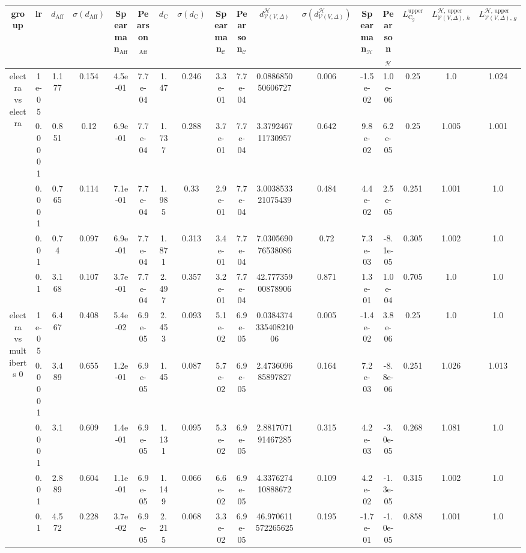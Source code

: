 \begin{tabular}{|c|c|c|c|c|c|c|c|c|c|c|c|c|c|c|c|c|}
\hline
group & lr & $d_{\mathrm{Aff}}$ & $\sigma(d_{\mathrm{Aff}})$ & Spearman$_{\mathrm{Aff}}$ & Pearson$_{\mathrm{Aff}}$ & $d_{\mathrm{C}}$ & $\sigma(d_{\mathrm{C}})$ & Spearman$_{\mathcal{C}}$ & Pearson$_{\mathcal{C}}$ & $d^\mathcal{H}_{\mathcal{V}(V,\Delta)}$ & $\sigma(d^\mathcal{H}_{\mathcal{V}(V,\Delta)})$ & Spearman$_{\mathcal{H}}$ & Pearson$_{\mathcal{H}}$ & $L_{\mathrm{C}_g}^{\mathrm{upper}}$ & $L^{\mathcal{H},\,\mathrm{upper}}_{\mathcal{V}(V,\Delta),\,h}$ & $L^{\mathcal{H},\,\mathrm{upper}}_{\mathcal{V}(V,\Delta),\,g}$ \\
\hline
\multirow{5}{*}{electra  vs electra } & 1e-05 & 1.177 & 0.154 & 4.5e-01 & 7.7e-04 & 1.47 & 0.246 & 3.3e-01 & 7.7e-04 & 0.088685050606727 & 0.006 & -1.5e-02 & 1.0e-06 & 0.25 & 1.0 & 1.024 \\
 & 0.0001 & 0.851 & 0.12 & 6.9e-01 & 7.7e-04 & 1.737 & 0.288 & 3.7e-01 & 7.7e-04 & 3.379246711730957 & 0.642 & 9.8e-02 & 6.2e-05 & 0.25 & 1.005 & 1.001 \\
 & 0.001 & 0.765 & 0.114 & 7.1e-01 & 7.7e-04 & 1.985 & 0.33 & 2.9e-01 & 7.7e-04 & 3.003853321075439 & 0.484 & 4.4e-02 & 2.5e-05 & 0.251 & 1.001 & 1.0 \\
 & 0.01 & 0.74 & 0.097 & 6.9e-01 & 7.7e-04 & 1.871 & 0.313 & 3.4e-01 & 7.7e-04 & 7.030569076538086 & 0.72 & 7.3e-03 & -8.1e-05 & 0.305 & 1.002 & 1.0 \\
 & 0.1 & 3.168 & 0.107 & 3.7e-01 & 7.7e-04 & 2.497 & 0.357 & 3.2e-01 & 7.7e-04 & 42.77735900878906 & 0.871 & 1.3e-01 & 1.0e-04 & 0.705 & 1.0 & 1.0 \\
\hline
\multirow{5}{*}{electra  vs multiberts 0} & 1e-05 & 6.467 & 0.408 & 5.4e-02 & 6.9e-05 & 2.453 & 0.093 & 5.1e-02 & 6.9e-05 & 0.038437433540821006 & 0.005 & -1.4e-02 & 3.8e-06 & 0.25 & 1.0 & 1.0 \\
 & 0.0001 & 3.489 & 0.655 & 1.2e-01 & 6.9e-05 & 1.45 & 0.087 & 5.7e-02 & 6.9e-05 & 2.473609685897827 & 0.164 & 7.2e-03 & -8.8e-06 & 0.251 & 1.026 & 1.013 \\
 & 0.001 & 3.1 & 0.609 & 1.4e-01 & 6.9e-05 & 1.131 & 0.095 & 5.3e-02 & 6.9e-05 & 2.881707191467285 & 0.315 & 4.2e-03 & -3.0e-05 & 0.268 & 1.081 & 1.0 \\
 & 0.01 & 2.889 & 0.604 & 1.1e-01 & 6.9e-05 & 1.149 & 0.066 & 6.6e-02 & 6.9e-05 & 4.337627410888672 & 0.109 & 4.2e-02 & -1.3e-05 & 0.315 & 1.002 & 1.0 \\
 & 0.1 & 4.572 & 0.228 & 3.7e-02 & 6.9e-05 & 2.215 & 0.068 & 3.3e-02 & 6.9e-05 & 46.970611572265625 & 0.195 & -1.7e-01 & -1.0e-05 & 0.858 & 1.001 & 1.0 \\

\end{tabular}
